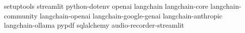 setuptools
streamlit
python-dotenv
openai
langchain
langchain-core
langchain-community
langchain-openai
langchain-google-genai
langchain-anthropic
langchain-ollama
pypdf
sqlalchemy
audio-recorder-streamlit

